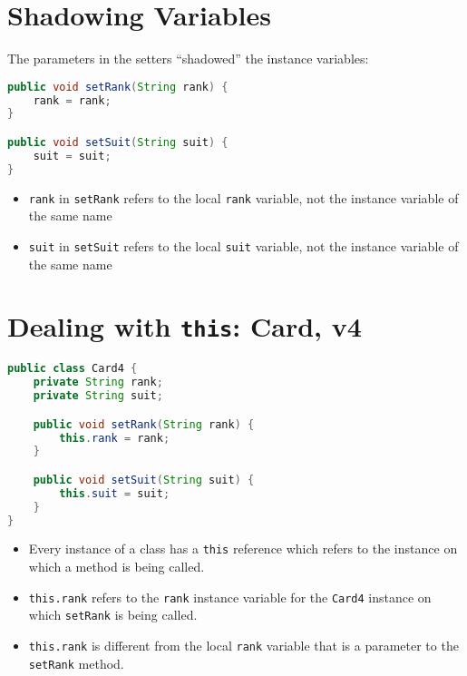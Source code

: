 \documentclass{article}
\begin{document}
\section{Shadowing Variables}


The parameters in the setters ``shadowed'' the instance variables:
\begin{lstlisting}[language=Java]
public void setRank(String rank) {
    rank = rank;
}

public void setSuit(String suit) {
    suit = suit;
}
\end{lstlisting}

\begin{itemize}
\item {\tt rank} in {\tt setRank} refers to the local {\tt rank} variable, not the instance variable of the same name
\item {\tt suit} in {\tt setSuit} refers to the local {\tt suit} variable, not the instance variable of the same name
\end{itemize}






\section{Dealing with {\tt this}: Card, v4}

\begin{lstlisting}[language=Java]
public class Card4 {
    private String rank;
    private String suit;

    public void setRank(String rank) {
        this.rank = rank;
    }

    public void setSuit(String suit) {
        this.suit = suit;
    }
}
\end{lstlisting}

\begin{itemize}
\item Every instance of a class has a {\tt this} reference which refers to the instance on which a method is being called.
\item {\tt this.rank} refers to the {\tt rank} instance variable for the {\tt Card4} instance on which {\tt setRank} is being called.
\item {\tt this.rank} is different from the local {\tt rank} variable that is a parameter to the {\tt setRank} method.
\end{itemize}
\end{document}
